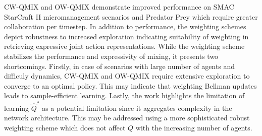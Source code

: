 \documentclass[11pt,letterpaper]{article}
\begin{document}
CW-QMIX and OW-QMIX demonstrate improved performance on SMAC StarCraft II micromanagement scenarios and Predator Prey which require greater collaboration per timestep. In addition to performance, the weighting schemes depict robustness to increased exploration indicating suitability of weighting in retrieving expressive joint action representations. While the weighting scheme stabilizes the performance and expressivity of mixing, it presents two shortcomings. Firstly, in case of scenarios with large number of agents and difficuly dynamics, CW-QMIX and OW-QMIX require extensive exploration to converge to an optimal policy. This may indicate that weighting Bellman updates leads to sample-efficient learning. Lastly, the work highlights the limitation of learning $\hat{Q}^{*}$ as a potential limitation since it aggregates complexity in the network architecture. This may be addressed using a more sophisticated robust weighting scheme which does not affect $Q$ with the increasing number of agents. 
\end{document}
